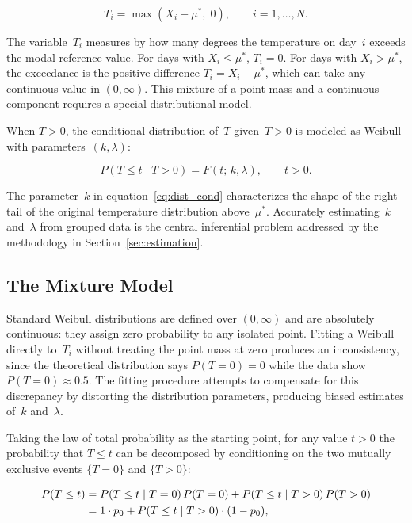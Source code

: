 \documentclass[APA,STIX1COL]{WileyNJD-v2}
\begin{document}
\begin{equation}\label{eq:Ti}
T_i = \max(X_i - \mu^*,\;0),\qquad i=1,\ldots,N.
\end{equation}

\medskip

The variable~$T_i$ measures by how many degrees the temperature
on day~$i$ exceeds the modal reference value. For days with
$X_i\leq\mu^*$, $T_i=0$. For days with $X_i>\mu^*$, the
exceedance is the positive difference $T_i=X_i-\mu^*$, which can
take any continuous value in $(0,\infty)$. This mixture of a
point mass and a continuous component requires a special
distributional model.

When $T>0$, the conditional distribution of~$T$ given~$T>0$ is
modeled as Weibull with parameters~$(k,\lambda)$:

\begin{equation}\label{eq:dist_cond}
P(T\leq t \mid T>0) = F(t;\,k,\lambda),\qquad t>0.
\end{equation}

The parameter~$k$ in equation~\eqref{eq:dist_cond} characterizes
the shape of the right tail of the original temperature
distribution above~$\mu^*$. Accurately estimating~$k$
and~$\lambda$ from grouped data is the central inferential problem
addressed by the methodology in Section~\ref{sec:estimation}.

\subsection{The Mixture Model}

Standard Weibull distributions are defined over $(0,\infty)$ and
are absolutely continuous: they assign zero probability to any
isolated point. Fitting a Weibull directly to~$T_i$ without
treating the point mass at zero produces an inconsistency, since
the theoretical distribution says $P(T=0)=0$ while the data show
$P(T=0)\approx 0.5$. The fitting procedure attempts to compensate
for this discrepancy by distorting the distribution parameters,
producing biased estimates of~$k$ and~$\lambda$.

Taking the law of total probability as the starting point, for
any value $t>0$ the probability that $T\leq t$ can be decomposed
by conditioning on the two mutually exclusive events $\{T=0\}$
and $\{T>0\}$:

\begin{align}
P(T\leq t)
  &= P(T\leq t\mid T=0)\,P(T=0)
   + P(T\leq t\mid T>0)\,P(T>0) \notag \\
  &= 1\cdot p_0 + P(T\leq t\mid T>0)\cdot (1-p_0),
    \label{eq:pt_total}
\end{align}
\end{document}
